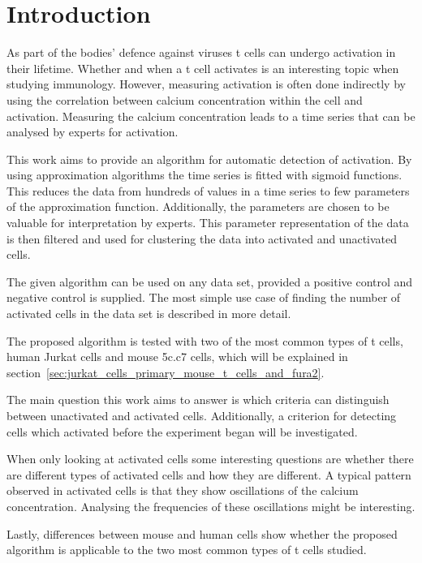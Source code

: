 \chapter{Introduction}
\label{chapter:introduction}

As part of the bodies' defence against viruses t cells can undergo activation in their lifetime. Whether and when a t cell activates is an interesting topic when studying immunology. However, measuring activation is often done indirectly by using the correlation between calcium concentration within the cell and activation. Measuring the calcium concentration leads to a time series that can be analysed by experts for activation.

This work aims to provide an algorithm for automatic detection of activation. By using approximation algorithms the time series is fitted with sigmoid functions. This reduces the data from hundreds of values in a time series to few parameters of the approximation function. Additionally, the parameters are chosen to be valuable for interpretation by experts. This parameter representation of the data is then filtered and used for clustering the data into activated and unactivated cells.

The given algorithm can be used on any data set, provided a positive control and negative control is supplied. The most simple use case of finding the number of activated cells in the data set is described in more detail.

The proposed algorithm is tested with two of the most common types of t cells, human Jurkat cells and mouse 5c.c7 cells, which will be explained in section~\ref{sec:jurkat_cells_primary_mouse_t_cells_and_fura2}.

\vspace*{0.7cm}
\noindent
The main question this work aims to answer is which criteria can distinguish between unactivated and activated cells. Additionally, a criterion for detecting cells which activated before the experiment began will be investigated.

When only looking at activated cells some interesting questions are whether there are different types of activated cells and how they are different. A typical pattern observed in activated cells is that they show oscillations of the calcium concentration. Analysing the frequencies of these oscillations might be interesting.

Lastly, differences between mouse and human cells show whether the proposed algorithm is applicable to the two most common types of t cells studied.

